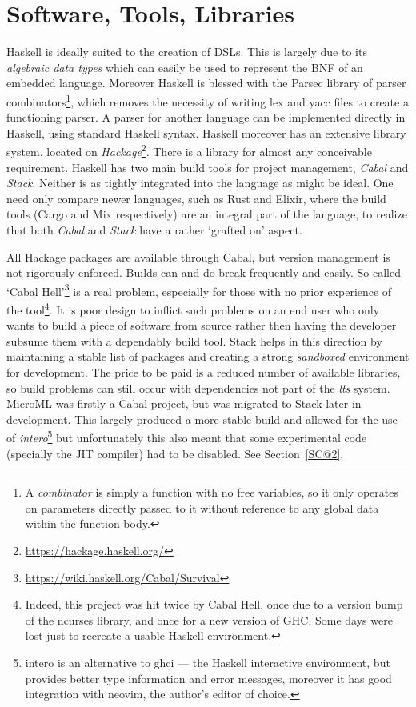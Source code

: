 \documentclass[12pt, a4paper]{report}
\begin{document}
\section{Software, Tools, Libraries}
Haskell is ideally suited to the creation of \gls{DSL}s. This is largely due to its
\textit{algebraic data types} which can easily be used to represent the BNF of an embedded
language. Moreover Haskell is blessed with the Parsec library\cite{leijen2001} of parser combinators\footnote{A
\textit{combinator} is simply a function with no free variables, so it only operates on
parameters directly passed to it without reference to any global data within the function
body.}, which removes the necessity of writing lex and yacc files to create a functioning
parser. A parser for another language can be implemented directly in Haskell, using
standard Haskell syntax. Haskell moreover has an extensive library system, located on
\textit{Hackage}\footnote{\url{https://hackage.haskell.org/}}. There is a library for almost any
conceivable requirement. Haskell has two main build tools for project management, \textit{Cabal} and
\textit{Stack}. Neither is as tightly integrated into the language as might be ideal. One need only
compare newer languages, such as Rust and Elixir, where the build tools (Cargo and Mix respectively)
are an integral part of the language, to realize that both \textit{Cabal} and \textit{Stack} have a
rather `grafted on' aspect.

All Hackage packages are available through Cabal, but version management is not
rigorously enforced. Builds can and do break frequently and easily. So-called `Cabal
Hell'\footnote{\url{https://wiki.haskell.org/Cabal/Survival}} is a real problem, especially for
those with no prior experience of the tool\footnote{Indeed, this project was hit twice by Cabal
Hell, once due to a version bump of the ncurses library, and once for a new version of GHC\@.
Some days were lost just to recreate a usable Haskell environment.}. It is poor design to inflict
such problems on an end user who only wants to build a piece of software from source rather then
having the developer subsume them with a dependably build tool. Stack helps in this direction by
maintaining a stable list of packages and creating a strong \textit{sandboxed} environment for
development. The price to be paid is a reduced number of available libraries, so build problems
can still occur with dependencies not part of the \textit{\gls{lts}} system. MicroML was firstly a Cabal
project, but was migrated to Stack later in development. This largely produced a more stable build
and allowed for the use of \textit{intero}\footnote{intero is an alternative to ghci --- the Haskell
interactive environment, but provides better type information and error messages, moreover it has
good integration with neovim, the author's editor of choice.} but unfortunately this also meant that some
experimental code (specially the JIT compiler) had to be disabled. See Section~\ref{SC@2}.
\end{document}
